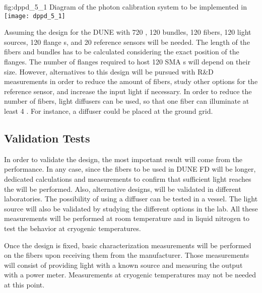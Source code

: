 \begin{dunefigure}{fig:dppd_5_1}
{Diagram of the photon calibration system to be implemented in }
\texttt{[image: dppd\_5\_1]}
\end{dunefigure}

Assuming the  design for the DUNE  with \num{720} , \num{120} bundles, \num{120} fibers, \num{120} light sources, \num{120} flange \fdth{}s, and \num{20} reference sensors will be needed. The length of the fibers and bundles has to be calculated considering the exact position of the \fdth flanges. The number of flanges required to host \num{120} SMA \fdth{}s will depend on their size. However, alternatives to this design will be pursued with R\&D measurements in order to reduce the amount of fibers, study other options for the reference sensor, and increase the input light if necessary. In order to reduce the number of fibers, light diffusers can be used, so that one fiber can illuminate at least \num{4} . For instance, a diffuser could be placed at the ground grid. 

\subsection{Validation Tests}
\label{sec:fddp-pd-5.2}

In order to validate the design, the most important result will come from the  performance. In any case, since the fibers to be used in DUNE FD will be longer, dedicated calculations and measurements to confirm that sufficient light reaches the  will be performed. Also, alternative designs, will be validated in different laboratories. The possibility of using a diffuser can be tested in a vessel. The light source will also be validated by studying the different options in the lab. All these measurements will be performed at room temperature and in liquid nitrogen to test the behavior at cryogenic temperatures.

Once the design is fixed, basic characterization measurements will be performed on the fibers upon receiving them from the manufacturer. Those measurements will consist of providing light with a known source and measuring the output with a power meter. Measurements at cryogenic temperatures may not be needed at this point.

